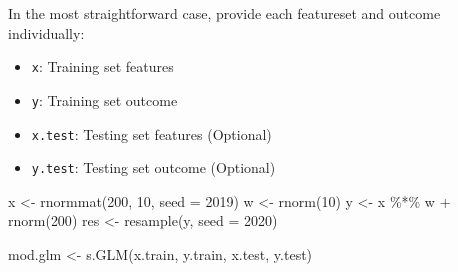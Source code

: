 \documentclass[
]{book}
\newenvironment{Shaded}{\begin{snugshade}}{\end{snugshade}}
\newcommand{\AttributeTok}[1]{\textcolor[rgb]{0.77,0.63,0.00}{#1}}
\newcommand{\DecValTok}[1]{\textcolor[rgb]{0.00,0.00,0.81}{#1}}
\newcommand{\FunctionTok}[1]{\textcolor[rgb]{0.00,0.00,0.00}{#1}}
\newcommand{\NormalTok}[1]{#1}
\newcommand{\OtherTok}[1]{\textcolor[rgb]{0.56,0.35,0.01}{#1}}
\newcommand{\SpecialCharTok}[1]{\textcolor[rgb]{0.00,0.00,0.00}{#1}}
\providecommand{\tightlist}{%
  \setlength{\itemsep}{0pt}\setlength{\parskip}{0pt}}
\begin{document}
In the most straightforward case, provide each featureset and outcome individually:

\begin{itemize}
\tightlist
\item
  \texttt{x}: Training set features
\item
  \texttt{y}: Training set outcome
\item
  \texttt{x.test}: Testing set features (Optional)
\item
  \texttt{y.test}: Testing set outcome (Optional)
\end{itemize}

\begin{Shaded}
\begin{Highlighting}[]
\NormalTok{x }\OtherTok{\textless{}{-}} \FunctionTok{rnormmat}\NormalTok{(}\DecValTok{200}\NormalTok{, }\DecValTok{10}\NormalTok{, }\AttributeTok{seed =} \DecValTok{2019}\NormalTok{)}
\NormalTok{w }\OtherTok{\textless{}{-}} \FunctionTok{rnorm}\NormalTok{(}\DecValTok{10}\NormalTok{)}
\NormalTok{y }\OtherTok{\textless{}{-}}\NormalTok{ x }\SpecialCharTok{\%*\%}\NormalTok{ w }\SpecialCharTok{+} \FunctionTok{rnorm}\NormalTok{(}\DecValTok{200}\NormalTok{)}
\NormalTok{res }\OtherTok{\textless{}{-}} \FunctionTok{resample}\NormalTok{(y, }\AttributeTok{seed =} \DecValTok{2020}\NormalTok{)}
\end{Highlighting}
\end{Shaded}

\begin{Shaded}
\end{Shaded}

\begin{Shaded}
\begin{Highlighting}[]
\NormalTok{mod.glm }\OtherTok{\textless{}{-}} \FunctionTok{s.GLM}\NormalTok{(x.train, y.train, x.test, y.test)}
\end{Highlighting}
\end{Shaded}
\end{document}
